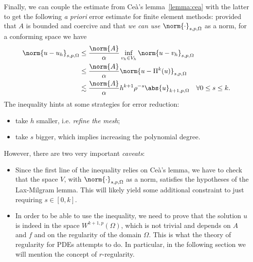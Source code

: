 Finally, we can couple the estimate from Ceà's lemma~\ref{lemma:cea} with the latter to get the following \emph{a priori} error estimate for finite element methods: provided that $A$ is bounded and coercive and that \emph{we can use} $\norm{\cdot}_{s,p,\Omega}$ as a norm, for a conforming space we have
\begin{align} \label{ineq:cea_scaling}
\norm{u - u_h}_{s,p,\Omega} &\le \frac{\norm{A}}{\alpha} \inf_{v_h \in V_h} \norm{u - v_h}_{s,p,\Omega} \\
& \le \frac{\norm{A}}{\alpha} \norm{u - \Pi^k(u)}_{s,p,\Omega} \\
& \lesssim \frac{\norm{A}}{\alpha} h^{k+1} \rho^{-s} \abs{u}_{k+1,p,\Omega} \quad \forall 0\le s \le k.
\end{align}
The inequality hints at some strategies for error reduction:
\begin{itemize}
\item take $h$ smaller, i.e. \emph{refine the mesh};
\item take $s$ bigger, which implies increasing the polynomial degree.
\end{itemize}
However, there are two very important \emph{caveats}:
\begin{itemize}
\item Since the first line of the inequality relies on Ceà's lemma, we have to check that the space $V$, with $\norm{\cdot}_{s,p,\Omega}$ as a norm, satisfies the hypotheses of the Lax-Milgram lemma. This will likely yield some additional constraint to just requiring $s \in [0,k]$.
\item In order to be able to use the inequality, we need to prove that the solution $u$ is indeed in the space $W^{k+1,p}(\Omega)$, which is not trivial and depends on $A$ and $f$ and on the regularity of the domain $\Omega$. This is what the theory of regularity for PDEs attempts to do. In particular, in the following section we will mention the concept of $r$-regularity.
\end{itemize}



